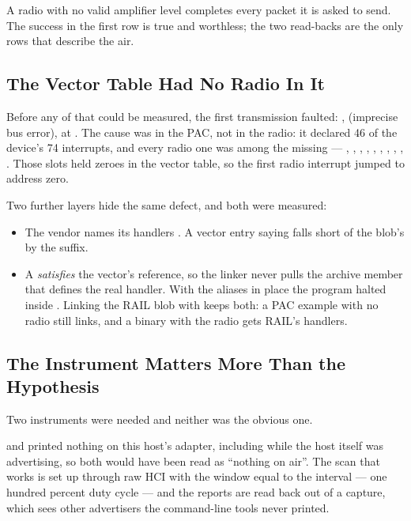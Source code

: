 A radio with no valid amplifier level completes every packet it is asked to send. The success in the
first row is true and worthless; the two read-backs are the only rows that describe the air.

\subsection{The Vector Table Had No Radio In It}

Before any of that could be measured, the first transmission faulted: ,
 (imprecise bus error), at . The cause was in the
PAC, not in the radio: it declared 46 of the device's 74 interrupts, and every radio one was among the
missing --- , , , ,
, , , ,
, . Those slots held zeroes in the vector table, so the first
radio interrupt jumped to address zero.

Two further layers hide the same defect, and both were measured:

\begin{itemize}
    \item The vendor names its handlers . A vector entry saying
           falls short of the blob's  by the suffix.
    \item A  \emph{satisfies} the vector's reference, so the
          linker never pulls the archive member that defines the real handler. With the aliases in
          place the program halted inside . Linking the RAIL blob with
           keeps both: a PAC example with no radio still links, and a binary
          with the radio gets RAIL's handlers.
\end{itemize}

\subsection{The Instrument Matters More Than the Hypothesis}

Two instruments were needed and neither was the obvious one.

 and  printed nothing on this host's adapter,
including while the host itself was advertising, so both would have been read as ``nothing on air''.
The scan that works is set up through raw HCI with the window equal to the interval --- one hundred
percent duty cycle --- and the reports are read back out of a  capture, which sees
other advertisers the command-line tools never printed.

